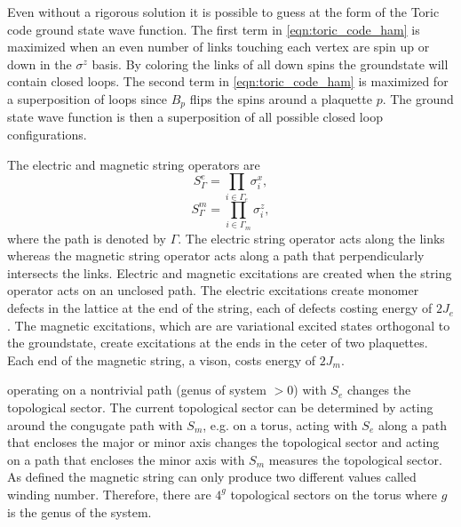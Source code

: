 \documentclass[twocolumn,prb,aps,floatfix,superscriptaddress]{revtex4-1}
\begin{document}
    Even without a rigorous solution it is possible to guess at the form of the Toric code
    ground state wave function. The first term in \ref{eqn:toric_code_ham} is maximized 
    when an even number of links touching each vertex are spin up or down in the
    $\sigma^z$ basis. By coloring the links of all down spins the groundstate will
    contain closed loops. The second term in \ref{eqn:toric_code_ham} is maximized for a
    superposition of loops since $B_p$ flips the spins around a plaquette $p$. The ground state
    wave function is then a superposition of all possible closed loop configurations. 

    The electric and magnetic string operators are
    \begin{equation}
        S^e_{\Gamma} = \prod_{i\in\Gamma_e} \sigma^x_i
        ,
    \end{equation}
    \begin{equation}
        S^m_{\Gamma} = \prod_{i\in\Gamma_m} \sigma^z_i
        ,
    \end{equation}
    where the path is denoted by $\Gamma$. The electric string operator acts along the
    links whereas the magnetic string operator acts along a path that perpendicularly
    intersects the links. 
    Electric and magnetic excitations are created when the string operator acts on an unclosed path. 
    The electric excitations create monomer defects in the lattice at the end of the string, 
    each of defects costing energy of $2J_e$. 
    The magnetic excitations, which are 
    are variational excited states  orthogonal
    to the groundstate, create excitations at the ends in the ceter of two plaquettes.
    Each end of the magnetic
    string, a vison, costs energy of $2J_m$. 

    operating on a nontrivial path (genus of system $>0$) with $S_e$ changes the topological sector.
    The current topological sector can be determined
    by acting around the congugate path with $S_m$, e.g. on a torus, acting with $S_e$ along a
    path that encloses the major or minor axis changes the topological sector and acting on a path
    that encloses the minor axis with $S_m$ measures the topological sector.
    As defined the magnetic string can only produce two different values called winding number.
    Therefore, there are $4^g$ topological sectors on the torus where $g$ is the
    genus of the system. 
\end{document}

